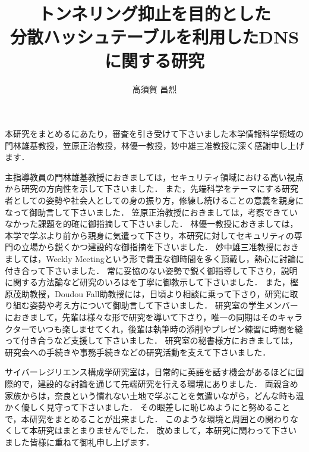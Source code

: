 \documentclass[12pt]{jarticle} %
\title{トンネリング抑止を目的とした\\分散ハッシュテーブルを利用したDNSに関する研究}
\author{高須賀 昌烈}
\begin{document}
\titlepage
\cmemberspage
\firstabstract
\secondabstract



\toc
\newpage
\listoffigures
\newpage
\listoftables
\listofalgorithms



\newpage
{}











\newpage
\acknowledgements
本研究をまとめるにあたり，審査を引き受けて下さいました本学情報科学領域の門林雄基教授，笠原正治教授，林優一教授，妙中雄三准教授に深く感謝申し上げます．

主指導教員の門林雄基教授におきましては，セキュリティ領域における高い視点から研究の方向性を示して下さいました．
また，先端科学をテーマにする研究者としての姿勢や社会人としての身の振り方，修練し続けることの意義を親身になって御助言して下さいました．
笠原正治教授におきましては，考察できていなかった課題を的確に御指摘して下さいました．
林優一教授におきましては，本学で学ぶより前から親身に気遣って下さり，本研究に対してセキュリティの専門の立場から鋭くかつ建設的な御指摘を下さいました．
妙中雄三准教授におきましては，Weekly Meetingという形で貴重な御時間を多く頂戴し，熱心に討論に付き合って下さいました．
常に妥協のない姿勢で鋭く御指導して下さり，説明に関する方法論など研究のいろはを丁寧に御教示して下さいました．
また，樫原茂助教授，Doudou Fall助教授には，日頃より相談に乗って下さり，研究に取り組む姿勢や考え方について御助言して下さいました．
研究室の学生メンバーにおきまして，先輩は様々な形で研究を導いて下さり，唯一の同期はそのキャラクターでいつも楽しませてくれ，後輩は執筆時の添削やプレゼン練習に時間を縫って付き合うなど支援して下さいました．
研究室の秘書様方におきましては，研究会への手続きや事務手続きなどの研究活動を支えて下さいました．

サイバーレジリエンス構成学研究室は，日常的に英語を話す機会があるほどに国際的で，建設的な討論を通じて先端研究を行える環境にありました．
両親含め家族からは，奈良という慣れない土地で学ぶことを気遣いながら，どんな時も温かく優しく見守って下さいました．
その眼差しに恥じぬようにと努めることで，本研究をまとめることが出来ました．
このような環境と周囲との関わりなくして本研究はまとまりませんでした．
改めまして，本研究に関わって下さいました皆様に重ねて御礼申し上げます．
\end{document}
